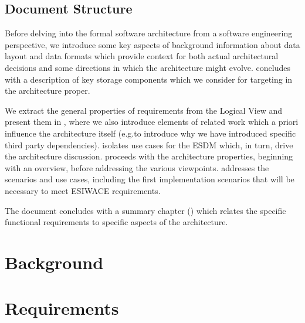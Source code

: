 \documentclass[a4paper,11pt]{esiwace-modified}
\begin{document}
\section{Document Structure}

Before delving into the formal software architecture from a software engineering perspective,
we introduce some key aspects of background information about data layout and data formats which provide context for both actual architectural decisions and some directions in which the architecture might evolve.
 concludes with a description of key storage components which we consider for targeting in the architecture proper.

We extract the general properties of requirements from the Logical View and present them in , where we also introduce elements
of related work which a priori influence the architecture itself (e.g.to introduce why we have introduced specific third party dependencies).
 isolates use cases for the ESDM which, in turn, drive the architecture discussion.
 proceeds with the architecture properties, beginning with an overview, before addressing the various viewpoints.
 addresses the scenarios and use cases, including the first implementation scenarios that will be necessary to meet ESIWACE requirements.

The document concludes with a summary chapter () which relates the specific functional requirements to specific aspects of the architecture.



 \chapter{Background}
\label{sec:background}







\chapter{Requirements}
\label{sec:requirements}


%
\end{document}
